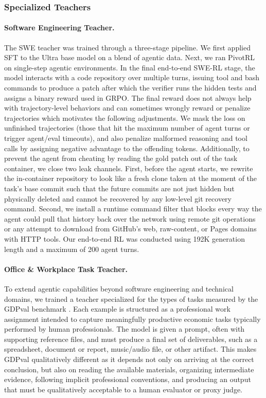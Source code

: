 \subsubsection{Specialized Teachers}


\paragraph{Software Engineering Teacher.}
The SWE teacher was trained through a three-stage pipeline. We first applied SFT to the Ultra base model on a blend of agentic data. Next, we ran PivotRL~\citep{yi2026pivotrl} on single-step agentic environments. In the final end-to-end SWE-RL stage, the model interacts with a code repository over multiple turns, issuing tool and bash commands to produce a patch after which the verifier runs the hidden tests and assigns a binary reward used in GRPO. The final reward does not always help with trajectory-level behaviors and can sometimes wrongly reward or penalize trajectories which motivates the following adjustments. We mask the loss on unfinished trajectories (those that hit the maximum number of agent turns or trigger agent/eval timeouts), and also penalize malformed reasoning and tool calls by assigning negative advantage to the offending tokens. Additionally, to prevent the agent from cheating by reading the gold patch out of the task container, we close two leak channels. First, before the agent starts, we rewrite the in-container repository to look like a fresh clone taken at the moment of the task's base commit such that the future commits are not just hidden but physically deleted and cannot be recovered by any low-level git recovery command. Second, we install a runtime command filter that blocks every way the agent could pull that history back over the network using remote git operations or any attempt to download from GitHub's web, raw-content, or Pages domains with HTTP tools. Our end-to-end RL was conducted using 192K generation length and a maximum of 200 agent turns.

\paragraph{Office \& Workplace Task Teacher.}
To extend agentic capabilities beyond software engineering and technical domains, we trained a teacher specialized for the types of tasks measured by the GDPval benchmark \citep{patwardhan2025gdpval}. Each example is structured as a professional work assignment intended to capture meaningfully productive economic tasks typically performed by human professionals. The model is given a prompt, often with supporting reference files, and must produce a final set of deliverables, such as a spreadsheet, document or report, music/audio file, or other artifact. This makes GDPval qualitatively different as it depends not only on arriving at the correct conclusion, but also on reading the available materials, organizing intermediate evidence, following implicit professional conventions, and producing an output that must be qualitatively acceptable to a human evaluator or proxy judge.

